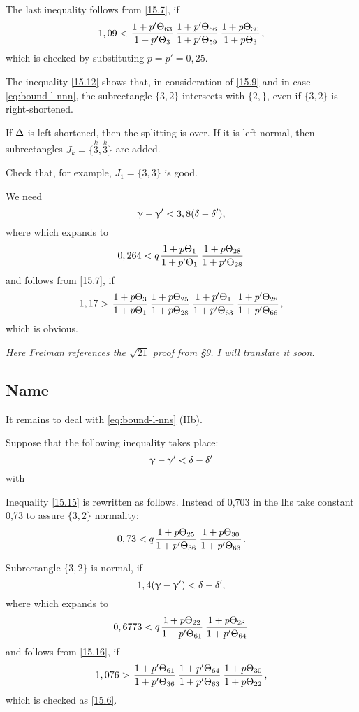 The last inequality follows from \ref{15.7}, if
\begin{equation*}
	1,09 < \pp{63}{3} \pp{66}{59} \uu{30}{3},
\end{equation*}
which is checked by substituting $p = p' = 0,25$.

The inequality \ref{15.12} shows that, in consideration of \ref{15.9} and in case \ref{eq:bound-l-nnn},
the subrectangle $\{3,2\}$ intersects with $\{2,\}$, even if $\{3,2\}$ is right-shortened.

If $\Delta$ is left-shortened, then the splitting is over.
If it is left-normal, then subrectangles $J_k = \{\overset{k}{3}, \overset{k}{3}\}$ are added.

Check that, for example, $J_1 = \{3, 3\}$ is good.

We need
\begin{equation}\label{15.14}
	\upgamma - \upgamma' < 3,8 (\delta - \delta'),
\end{equation}
where
which expands to
\begin{equation}
	0,264 < q \up{1}{1} \up{28}{28}
\end{equation}
and follows from \ref{15.7}, if
\begin{equation*}
	1,17 > \uu{3}{1} \uu{25}{28} \pp{1}{63} \pp{28}{66},
\end{equation*}
which is obvious.

\textit{
	Here Freiman references the $\sqrt{21}$ proof from \S9.
	I will translate it soon.
}

\subsection{Name}

It remains to deal with \ref{eq:bound-l-nns} (IIb).

Suppose that the following inequality takes place:
\begin{equation}\label{15.15}
	\upgamma - \upgamma' < \delta - \delta'
\end{equation}
with

Inequality \ref{15.15} is rewritten as follows.
Instead of 0,703 in the lhs take constant 0,73 to assure $\{3, 2\}$ normality:
\begin{equation}\label{15.16}
	0,73 < q \up{25}{36} \up{30}{63}.
\end{equation}

Subrectangle $\{3, 2\}$ is normal, if
\begin{equation*}\label{15.17}
	1,4 (\upgamma - \upgamma') < \delta - \delta',
\end{equation*}
where
which expands to
\begin{equation*}
	0,6773 < q \up{22}{61} \up{28}{64}
\end{equation*}
and follows from \ref{15.16}, if
\begin{equation*}
	1,076 > \pp{61}{36} \pp{64}{63} \uu{30}{22},
\end{equation*}
which is checked as \ref{15.6}.

